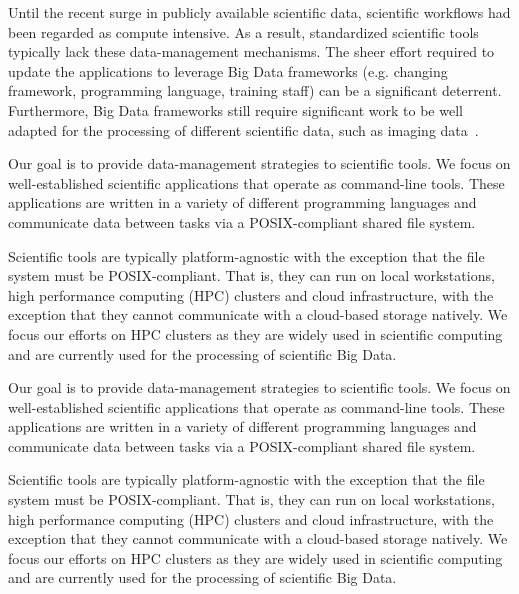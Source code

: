 \documentclass[10pt,journal,compsoc]{IEEEtran}
\begin{document}
Until the recent surge in publicly available scientific data, scientific
workflows had been regarded as compute intensive. As a result, standardized
scientific tools typically lack these data-management mechanisms. The sheer
effort required to update the applications to leverage Big Data frameworks (e.g.
changing framework, programming language, training staff) can be a significant
deterrent. Furthermore, Big Data frameworks still require significant work to be
well adapted for the processing of different scientific data, such as imaging
data~\cite{mehta2017comparative}. 





Our goal is to provide data-management strategies to scientific tools. We focus
on well-established scientific applications that operate as command-line tools.
These applications are written in a variety of different programming languages
and communicate data between tasks via a POSIX-compliant shared file system.

Scientific tools are typically platform-agnostic with the exception that the
file system must be POSIX-compliant. That is, they can run on local
workstations, high performance computing (HPC) clusters and cloud
infrastructure, with the exception that they cannot communicate with a
cloud-based storage natively. We focus our efforts on HPC clusters as they are
widely used in scientific computing and are currently used for the processing of
scientific Big Data.

Our goal is to provide data-management strategies to scientific tools. We focus
on well-established scientific applications that operate as command-line tools.
These applications are written in a variety of different programming languages
and communicate data between tasks via a POSIX-compliant shared file system.

Scientific tools are typically platform-agnostic with the exception that the
file system must be POSIX-compliant. That is, they can run on local
workstations, high performance computing (HPC) clusters and cloud
infrastructure, with the exception that they cannot communicate with a
cloud-based storage natively. We focus our efforts on HPC clusters as they are
widely used in scientific computing and are currently used for the processing of
scientific Big Data.
\end{document}
